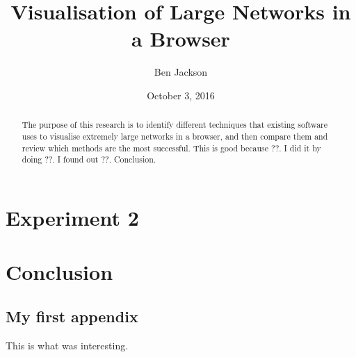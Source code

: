\documentclass{l4proj}
\begin{document}
\title{Visualisation of Large Networks in a Browser}
\author{Ben Jackson}
\date{October 3, 2016}
\maketitle

\begin{abstract}
The purpose of this research is to identify different techniques that existing software uses to visualise extremely large networks in a browser, and then compare them and review which methods are the most successful. This is good because ??. I did it by doing ??. I found out ??. Conclusion.
\end{abstract}

\educationalconsent
%
%

\tableofcontents
\pagebreak








\chapter{Experiment 2}

\chapter{Conclusion}


\begin{appendices}

\chapter{My first appendix}
This is what was interesting.

\end{appendices}




\end{document}
